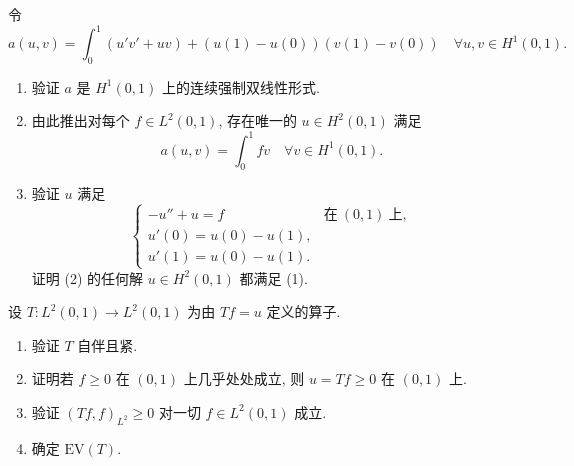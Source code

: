 \begin{exercise}
\label{exer:8.29}
令
\begin{equation*}
a(u,v)=\int_0^1(u'v'+uv)+(u(1)-u(0))(v(1)-v(0))
\quad\forall u,v\in H^1(0,1).
\end{equation*}
\begin{enumerate}[label=\arabic*., leftmargin=2.2em, itemsep=0.3em]
	\item 验证 $a$ 是 $H^1(0,1)$ 上的连续强制双线性形式.
	\item 由此推出对每个 $f\in L^2(0,1)$, 存在唯一的 $u\in H^2(0,1)$ 满足
	      \begin{equation}
	      a(u,v)=\int_0^1fv\quad\forall v\in H^1(0,1).
	      \tag{1}
	      \end{equation}
	\item 验证 $u$ 满足
	      \begin{equation}
	      \begin{cases}
	      -u''+u=f & \text{在}\ (0,1)\ \text{上},\\
	      u'(0)=u(0)-u(1),\\
	      u'(1)=u(0)-u(1).
	      \end{cases}
	      \tag{2}
	      \end{equation}
	      证明 (2) 的任何解 $u\in H^2(0,1)$ 都满足 (1).
\end{enumerate}
设 $T:L^2(0,1)\to L^2(0,1)$ 为由 $Tf=u$ 定义的算子.
\begin{enumerate}[label=\arabic*., leftmargin=2.2em, itemsep=0.3em, start=4]
	\item 验证 $T$ 自伴且紧.
	\item 证明若 $f\ge0$ 在 $(0,1)$ 上几乎处处成立, 则 $u=Tf\ge0$ 在
	      $(0,1)$ 上.
	\item 验证 $(Tf,f)_{L^2}\ge0$ 对一切 $f\in L^2(0,1)$ 成立.
	\item 确定 $\mathrm{EV}(T)$.
\end{enumerate}
\end{exercise}

